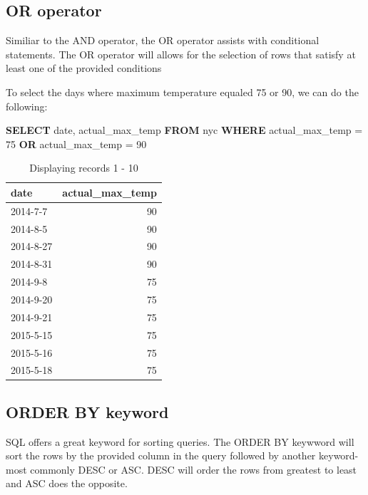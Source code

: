 \documentclass[]{book}
\newenvironment{Shaded}{\begin{snugshade}}{\end{snugshade}}
\newcommand{\KeywordTok}[1]{\textcolor[rgb]{0.13,0.29,0.53}{\textbf{#1}}}
\newcommand{\DataTypeTok}[1]{\textcolor[rgb]{0.13,0.29,0.53}{#1}}
\newcommand{\DecValTok}[1]{\textcolor[rgb]{0.00,0.00,0.81}{#1}}
\newcommand{\NormalTok}[1]{#1}
\begin{document}
\subsection{OR operator}\label{or-operator}

Similiar to the AND operator, the OR operator assists with conditional
statements. The OR operator will allows for the selection of rows that
satisfy at least one of the provided conditions

To select the days where maximum temperature equaled 75 or 90, we can do
the following:

\begin{Shaded}
\begin{Highlighting}[]
\KeywordTok{SELECT} \DataTypeTok{date}\NormalTok{, actual_max_temp }\KeywordTok{FROM}\NormalTok{ nyc }\KeywordTok{WHERE}\NormalTok{ actual_max_temp = }\DecValTok{75} \KeywordTok{OR}\NormalTok{ actual_max_temp = }\DecValTok{90}
\end{Highlighting}
\end{Shaded}

\begin{table}

\caption{\label{tab:unnamed-chunk-70}Displaying records 1 - 10}
\centering
\begin{tabular}[t]{l|r}
\hline
date & actual\_max\_temp\\
\hline
2014-7-7 & 90\\
\hline
2014-8-5 & 90\\
\hline
2014-8-27 & 90\\
\hline
2014-8-31 & 90\\
\hline
2014-9-8 & 75\\
\hline
2014-9-20 & 75\\
\hline
2014-9-21 & 75\\
\hline
2015-5-15 & 75\\
\hline
2015-5-16 & 75\\
\hline
2015-5-18 & 75\\
\hline
\end{tabular}
\end{table}

\subsection{ORDER BY keyword}\label{order-by-keyword}

SQL offers a great keyword for sorting queries. The ORDER BY keywword
will sort the rows by the provided column in the query followed by
another keyword- most commonly DESC or ASC. DESC will order the rows
from greatest to least and ASC does the opposite.
\end{document}

